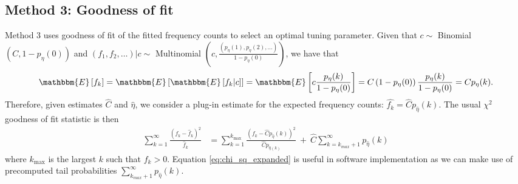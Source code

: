 \documentclass[12pt]{article}
\newcommand{\kmax}{k_{\text{max}}}
\newcommand{\lambdagrid}{\lambda^{\text{grid}}}
\theoremstyle{break}
\theoremstyle{break}
\begin{document}

%
%
%
\subsection{Method 3: Goodness of fit}

Method 3 uses goodness of fit of the fitted frequency counts to select an optimal tuning parameter.
Given that $c \sim$ Binomial $\left(C, 1- p_{\eta}(0)\right)$ and $(f_1, f_2, \ldots)|c \sim$  Multinomial $\left(c,  \frac{(p_{\eta}(1), p_{\eta}(2), \ldots)}{1-p_{\eta}(0)}\right)$, we have that
\begin{equation}
 \mathbbm{E}\left[f_k\right] = \mathbbm{E}\left[\mathbbm{E}\left[f_k|c \right]\right] = \mathbbm{E}\left[ c \frac{p_{\eta}(k)}{1-p_{\eta}(0)} \right] = C\left(1-p_{\eta}(0) \right) \frac{p_{\eta}(k)}{1-p_{\eta}(0)} = Cp_{\eta}(k).
\end{equation}
Therefore, given estimates $\widehat{C}$ and $\widehat{\eta}$, we consider a plug-in estimate for the expected frequency counts: $\widehat{f_k} = \widehat{C}p_{\widehat{\eta}}(k)$.  The usual $\chi^2$ goodness of fit statistic is then
\begin{align}
\sum_{k=1}^{\infty} \frac{\left(f_k - \widehat{f}_k \right)^2 }{\widehat{f}_k} %
&= \sum_{k=1}^{\kmax} \frac{\left(f_k - \widehat{C}p_{\widehat{\eta}}(k) \right)^2 }{\widehat{C} p_{\widehat{\eta}(k)}} \ + \ \widehat{C} \sum_{k = k_{max}+1}^{\infty} p_{\widehat{\eta}}(k)
\label{eq:chi_sq_expanded}
\end{align}
where $\kmax$ is the largest $k$ such that $f_k > 0$.
Equation \eqref{eq:chi_sq_expanded} is useful in software implementation as we can make use of precomputed tail probabilities $\sum_{k_{max}+1}^{\infty} p_{\widehat{\eta}}(k)$.
\end{document}
